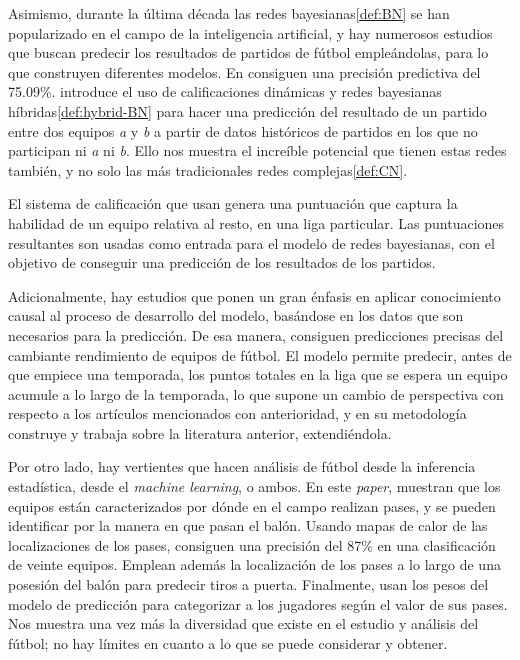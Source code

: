 Asimismo, durante la última década las redes bayesianas\ref{def:BN} se han popularizado en el campo 
de la inteligencia artificial, y hay numerosos estudios que buscan predecir los resultados 
de partidos de fútbol empleándolas, para lo que construyen diferentes modelos\cite{prediction-barcelona}.
En \cite{razali-2017} consiguen una precisión predictiva del 75.09\%. \cite{dolores} introduce el uso 
de calificaciones dinámicas\cite{pi-ratings} y redes bayesianas híbridas\ref{def:hybrid-BN} para hacer una predicción del resultado de un 
partido entre dos equipos \textit{a} y \textit{b} a partir de datos históricos de partidos 
en los que no participan ni \textit{a} ni \textit{b}. Ello nos muestra 
el increíble potencial que tienen estas redes también, y no solo las más tradicionales 
redes complejas\ref{def:CN}. 

El sistema de calificación que usan genera una puntuación que captura la habilidad de un equipo relativa al resto, 
en una liga particular. Las puntuaciones resultantes son usadas como entrada para el modelo de redes bayesianas, 
con el objetivo de conseguir una predicción de los resultados de los partidos. 

Adicionalmente, hay estudios\cite{smart-data} que ponen un gran énfasis 
en aplicar conocimiento causal al proceso de desarrollo del modelo, basándose 
en los datos que son necesarios para la predicción. De esa manera, consiguen predicciones precisas 
del cambiante rendimiento de equipos de fútbol. El modelo permite predecir, antes de que empiece 
una temporada, los puntos totales en la liga que se espera un equipo acumule a lo largo de la temporada, lo 
que supone un cambio de perspectiva con respecto a los artículos mencionados con anterioridad, y en su 
metodología construye y trabaja sobre la literatura anterior, extendiéndola.

Por otro lado, hay vertientes que hacen análisis de fútbol desde la inferencia estadística, desde 
el \textit{machine learning}, o ambos\cite{ML-inference}. En este \textit{paper}, muestran que 
los equipos están caracterizados por dónde en el campo realizan pases, y se 
pueden identificar por la manera en que pasan el balón. Usando mapas de calor de las localizaciones 
de los pases, consiguen una precisión del 87\% en una clasificación de veinte equipos. Emplean 
además la localización de los pases a lo largo de una posesión del balón para predecir tiros a 
puerta. Finalmente, usan los pesos del modelo de predicción para categorizar a los jugadores 
según el valor de sus pases. Nos muestra una vez más la diversidad que existe en el estudio 
y análisis del fútbol; no hay límites en cuanto a lo que se puede considerar y obtener.

